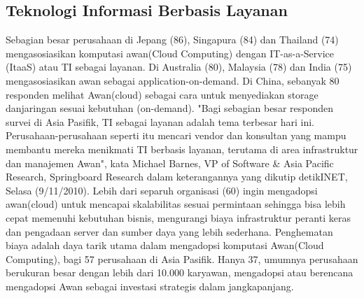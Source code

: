 \subsection{Teknologi Informasi Berbasis Layanan}
\tab Sebagian besar perusahaan di Jepang (86), Singapura (84) dan Thailand (74)
mengasosiasikan komputasi awan(Cloud Computing) dengan IT-as-a-Service (ItaaS) atau TI sebagai layanan. Di Australia (80), Malaysia (78) dan India (75) mengasosiasikan awan sebagai application-on-demand. Di China, sebanyak 80 responden melihat Awan(cloud) sebagai cara untuk menyediakan storage danjaringan sesuai kebutuhan (on-demand). "Bagi sebagian besar responden survei di Asia Pasifik, TI sebagai layanan adalah tema terbesar hari ini. Perusahaan-perusahaan seperti itu mencari vendor dan konsultan yang mampu membantu mereka menikmati TI berbasis layanan, terutama di area infrastruktur dan manajemen Awan", kata Michael Barnes, VP of Software \& Asia Pacific Research, Springboard Research dalam keterangannya yang dikutip detikINET, Selasa (9/11/2010). Lebih dari separuh organisasi (60) ingin mengadopsi awan(cloud) untuk mencapai skalabilitas sesuai permintaan sehingga bisa lebih cepat memenuhi kebutuhan bisnis, mengurangi biaya infrastruktur peranti keras dan pengadaan server dan sumber daya yang lebih sederhana. Penghematan biaya adalah daya tarik utama dalam mengadopsi komputasi Awan(Cloud Computing), bagi 57 perusahaan di Asia Pasifik. Hanya 37, umumnya perusahaan berukuran besar dengan lebih dari 10.000 karyawan, mengadopsi atau berencana mengadopsi Awan sebagai investasi strategis dalam jangkapanjang.
